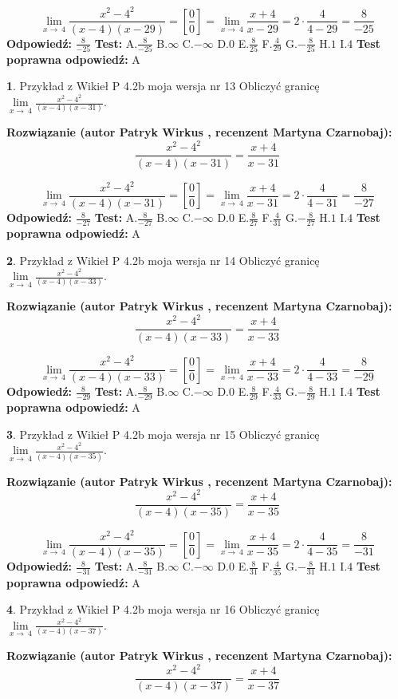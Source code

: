 \documentclass[12pt, a4paper]{article}
\theoremstyle{definition} %
\newtheorem{zad}{}
\newcommand{\zadStart}[1]{\begin{zad}#1\newline}
\newcommand{\zadStop}{\end{zad}}
\newcommand{\rozwStart}[2]{\noindent \textbf{Rozwiązanie (autor #1 , recenzent #2): }\newline}
\newcommand{\rozwStop}{\newline}
\newcommand{\odpStart}{\noindent \textbf{Odpowiedź:}\newline}
\newcommand{\odpStop}{\newline}
\newcommand{\testStart}{\noindent \textbf{Test:}\newline}
\newcommand{\testStop}{\newline}
\newcommand{\kluczStart}{\noindent \textbf{Test poprawna odpowiedź:}\newline}
\newcommand{\kluczStop}{\newline}
\begin{document}
$$\lim\limits_{x\to\ 4}\frac{x^{2}-4^{2}}{(x-4)(x-29)}=[\frac{0}{0}]=\lim\limits_{x\to\ 4}\frac{x+4}{x-29}=2 \cdot \frac{4}{4-29} = \frac{8}{-25}$$
\rozwStop
\odpStart
$\frac{8}{-25}$
\odpStop
\testStart
A.$\frac{8}{-25}$
B.$\infty$
C.$-\infty$
D.$0$
E.$\frac{8}{25}$
F.$\frac{4}{29}$
G.$-\frac{8}{25}$
H.$1$
I.$4$
\testStop
\kluczStart
A
\kluczStop



\zadStart{Przykład z Wikieł P 4.2b moja wersja nr 13}
Obliczyć granicę $\lim\limits_{x\to\ 4}\frac{x^{2}-4^{2}}{(x-4)(x-31)}$.
\zadStop
\rozwStart{Patryk Wirkus}{Martyna Czarnobaj}
$$\frac{x^{2}-4^{2}}{(x-4)(x-31)}=\frac{x+4}{x-31}$$

$$\lim\limits_{x\to\ 4}\frac{x^{2}-4^{2}}{(x-4)(x-31)}=[\frac{0}{0}]=\lim\limits_{x\to\ 4}\frac{x+4}{x-31}=2 \cdot \frac{4}{4-31} = \frac{8}{-27}$$
\rozwStop
\odpStart
$\frac{8}{-27}$
\odpStop
\testStart
A.$\frac{8}{-27}$
B.$\infty$
C.$-\infty$
D.$0$
E.$\frac{8}{27}$
F.$\frac{4}{31}$
G.$-\frac{8}{27}$
H.$1$
I.$4$
\testStop
\kluczStart
A
\kluczStop



\zadStart{Przykład z Wikieł P 4.2b moja wersja nr 14}
Obliczyć granicę $\lim\limits_{x\to\ 4}\frac{x^{2}-4^{2}}{(x-4)(x-33)}$.
\zadStop
\rozwStart{Patryk Wirkus}{Martyna Czarnobaj}
$$\frac{x^{2}-4^{2}}{(x-4)(x-33)}=\frac{x+4}{x-33}$$

$$\lim\limits_{x\to\ 4}\frac{x^{2}-4^{2}}{(x-4)(x-33)}=[\frac{0}{0}]=\lim\limits_{x\to\ 4}\frac{x+4}{x-33}=2 \cdot \frac{4}{4-33} = \frac{8}{-29}$$
\rozwStop
\odpStart
$\frac{8}{-29}$
\odpStop
\testStart
A.$\frac{8}{-29}$
B.$\infty$
C.$-\infty$
D.$0$
E.$\frac{8}{29}$
F.$\frac{4}{33}$
G.$-\frac{8}{29}$
H.$1$
I.$4$
\testStop
\kluczStart
A
\kluczStop



\zadStart{Przykład z Wikieł P 4.2b moja wersja nr 15}
Obliczyć granicę $\lim\limits_{x\to\ 4}\frac{x^{2}-4^{2}}{(x-4)(x-35)}$.
\zadStop
\rozwStart{Patryk Wirkus}{Martyna Czarnobaj}
$$\frac{x^{2}-4^{2}}{(x-4)(x-35)}=\frac{x+4}{x-35}$$

$$\lim\limits_{x\to\ 4}\frac{x^{2}-4^{2}}{(x-4)(x-35)}=[\frac{0}{0}]=\lim\limits_{x\to\ 4}\frac{x+4}{x-35}=2 \cdot \frac{4}{4-35} = \frac{8}{-31}$$
\rozwStop
\odpStart
$\frac{8}{-31}$
\odpStop
\testStart
A.$\frac{8}{-31}$
B.$\infty$
C.$-\infty$
D.$0$
E.$\frac{8}{31}$
F.$\frac{4}{35}$
G.$-\frac{8}{31}$
H.$1$
I.$4$
\testStop
\kluczStart
A
\kluczStop



\zadStart{Przykład z Wikieł P 4.2b moja wersja nr 16}
Obliczyć granicę $\lim\limits_{x\to\ 4}\frac{x^{2}-4^{2}}{(x-4)(x-37)}$.
\zadStop
\rozwStart{Patryk Wirkus}{Martyna Czarnobaj}
$$\frac{x^{2}-4^{2}}{(x-4)(x-37)}=\frac{x+4}{x-37}$$
\end{document}
